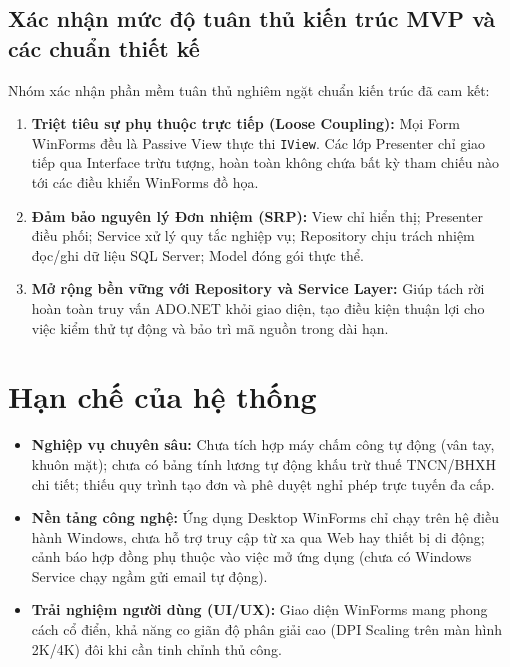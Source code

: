 \documentclass[12pt,a4paper]{report}
\begin{document}
\subsection{Xác nhận mức độ tuân thủ kiến trúc MVP và các chuẩn thiết kế}
Nhóm xác nhận phần mềm tuân thủ nghiêm ngặt chuẩn kiến trúc đã cam kết:
\begin{enumerate}[leftmargin=1.0cm]
    \item \textbf{Triệt tiêu sự phụ thuộc trực tiếp (Loose Coupling):} Mọi Form WinForms đều là Passive View thực thi \texttt{IView}. Các lớp Presenter chỉ giao tiếp qua Interface trừu tượng, hoàn toàn không chứa bất kỳ tham chiếu nào tới các điều khiển WinForms đồ họa.
    \item \textbf{Đảm bảo nguyên lý Đơn nhiệm (SRP):} View chỉ hiển thị; Presenter điều phối; Service xử lý quy tắc nghiệp vụ; Repository chịu trách nhiệm đọc/ghi dữ liệu SQL Server; Model đóng gói thực thể.
    \item \textbf{Mở rộng bền vững với Repository và Service Layer:} Giúp tách rời hoàn toàn truy vấn ADO.NET khỏi giao diện, tạo điều kiện thuận lợi cho việc kiểm thử tự động và bảo trì mã nguồn trong dài hạn.
\end{enumerate}

\section{Hạn chế của hệ thống}
\begin{itemize}[leftmargin=1.0cm]
    \item \textbf{Nghiệp vụ chuyên sâu:} Chưa tích hợp máy chấm công tự động (vân tay, khuôn mặt); chưa có bảng tính lương tự động khấu trừ thuế TNCN/BHXH chi tiết; thiếu quy trình tạo đơn và phê duyệt nghỉ phép trực tuyến đa cấp.
    \item \textbf{Nền tảng công nghệ:} Ứng dụng Desktop WinForms chỉ chạy trên hệ điều hành Windows, chưa hỗ trợ truy cập từ xa qua Web hay thiết bị di động; cảnh báo hợp đồng phụ thuộc vào việc mở ứng dụng (chưa có Windows Service chạy ngầm gửi email tự động).
    \item \textbf{Trải nghiệm người dùng (UI/UX):} Giao diện WinForms mang phong cách cổ điển, khả năng co giãn độ phân giải cao (DPI Scaling trên màn hình 2K/4K) đôi khi cần tinh chỉnh thủ công.
\end{itemize}
\end{document}
